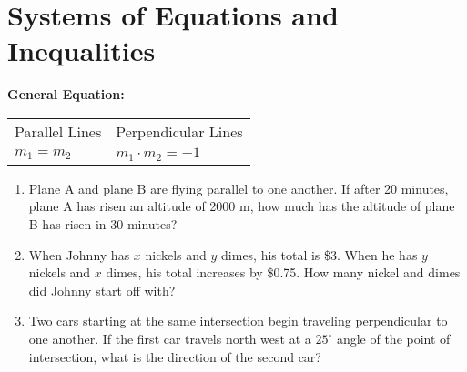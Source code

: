 \section[System of Equations]{Systems of Equations and Inequalities}

\bigskip
\textbf{General Equation:} 

\bigskip
\begin{tabularx}{\textwidth}{*2{@{}>{\centering\arraybackslash}X}}
Parallel Lines & Perpendicular Lines\\
$m_1 = m_2$ & $m_1 \cdot m_2 = -1$
\end{tabularx}

\vfill
\begin{enumerate}[labelindent=*,style=multiline,leftmargin=*,label=\textbf{Example \arabic*:}]
\item Plane A and plane B are flying parallel to one another. If after 20 minutes, plane A has risen an altitude of 2000 m, how much has the altitude of plane B has risen in 30 minutes?

\vfill\item When Johnny has $x$ nickels and $y$ dimes, his total is \$3. When he has $y$ nickels and $x$ dimes, his total increases by \$0.75. How many nickel and dimes did Johnny start off with?

\vfill\item Two cars starting at the same intersection begin traveling perpendicular to one another. If the first car travels north west at a $25^\circ$ angle of the point of intersection, what is the direction of the second car?
\end{enumerate}

